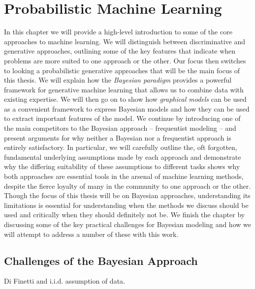 %
%	


\chapter{Probabilistic Machine Learning}
\label{chp:bayes}

In this chapter we will provide a high-level introduction to  some of the core approaches to
machine learning.  We will distinguish between discriminative and generative approaches,
outlining some of the key features that indicate when problems are more suited to one approach
or the other.  Our focus then switches to looking a probabilistic generative approaches that
will be the main focus of this thesis.  We will explain how the \emph{Bayesian paradigm} provides
a powerful framework for generative machine learning that allows us to combine data with existing
expertise.  We will then go on to show how \emph{graphical models} can be used as a convenient
framework to express Bayesian models and how they can be used to extract important features of the
model.  We continue by introducing one of the main competitors to the Bayesian approach -- frequentist
modeling -- and present arguments for why neither a Bayesian nor a frequentist approach is
entirely satisfactory.  In particular, we will carefully outline the, oft forgotten, fundamental underlying
assumptions made by each approach and demonstrate why the differing suitability of these assumptions
to different tasks shows why both approaches are essential tools in the arsenal of machine learning
methods, despite the fierce loyalty of many in the community to one approach or the other.
Though the focus of this thesis will be on Bayesian approaches, understanding its limitations
is essential for understanding when the methods we discuss should be used and critically when they
should definitely not be.  We finish the chapter by discussing some of the key practical challenges
for Bayesian modeling and how we will attempt to address a number of these with this work.







\section{Challenges of the Bayesian Approach}
\label{sec:bayes:challenges}

Di Finetti and i.i.d. assumption of data.